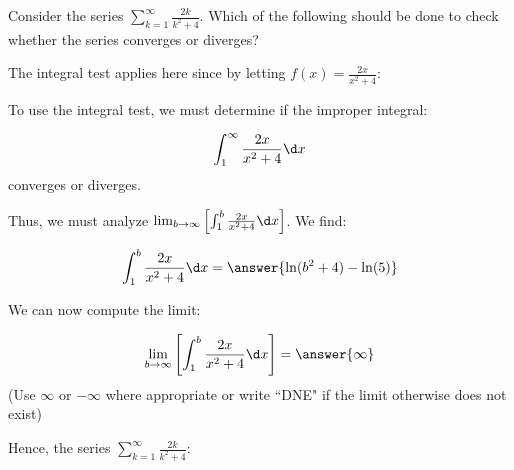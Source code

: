 \documentclass{ximera}
\author{Jim Talamo}
\begin{document}
\begin{exercise}
Consider the series $\sum_{k=1}^{\infty} \frac{2k}{k^2+4}$.  Which of the following should be done to check whether the series converges or diverges?
\begin{multipleChoice}
\end{multipleChoice}

\begin{exercise}
The integral test applies here since by letting $f(x) = \frac{2x}{x^2+4}$:
\begin{selectAll}
\end{selectAll}

To use the integral test, we must determine if the improper integral:

\[
\int_1^{\infty} \frac{2x}{x^2+4} \d x
\]
converges or diverges.

Thus, we must analyze $\lim_{b \to \infty} \left[\int_1^b \frac{2x}{x^2+4} \d x\right]$.  We find:

\[
\int_1^b \frac{2x}{x^2+4} \d x = \answer{\ln(b^2+4) - \ln(5)}
\]

\begin{exercise}
We can now compute the limit:

\[ \lim_{b \to \infty} \left[\int_1^b \frac{2x}{x^2+4} \d x\right] = \answer{\infty} \]
(Use $\infty$ or $-\infty$ where appropriate or write ``DNE" if the limit otherwise does not exist)

Hence, the series  $\sum_{k=1}^{\infty} \frac{2k}{k^2+4}$:
\begin{multipleChoice}
\end{multipleChoice}
\end{exercise}
\end{exercise}
\end{exercise}
\end{document}
